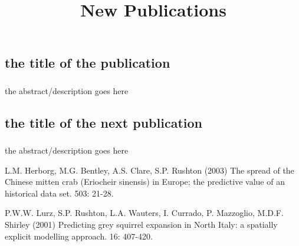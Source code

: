 

\title{New Publications}
\maketitle


\subsection{the title of the publication}

\subsubsection{\cite{herborg:2003}}


the abstract/description goes here

\subsection{the title of the next publication}
\subsubsection{\cite{lurz:2001}}

the abstract/description goes here





\begin{footnotesize}
\begin{thebibliography}{99}

 
L.M. Herborg, M.G. Bentley, A.S. Clare, S.P. Rushton (2003)
\newblock The spread of the Chinese mitten crab (Eriocheir sinensis) in
Europe; the predictive value of an historical data set.
 503: 21-28.

 P.W.W. Lurz, S.P. Rushton, L.A. Wauters, I. Currado,
P. Mazzoglio, M.D.F. Shirley (2001)
\newblock Predicting grey squirrel expansion in North Italy: a spatially
explicit modelling approach.
 16: 407-420.



\end{thebibliography}
\end{footnotesize}




